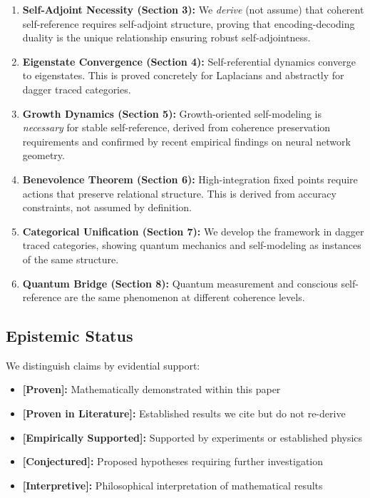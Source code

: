\documentclass[11pt]{article}
\theoremstyle{definition}
\theoremstyle{remark}
\begin{document}
\begin{enumerate}
    \item \textbf{Self-Adjoint Necessity (Section 3):} We \emph{derive} (not assume) that coherent self-reference requires self-adjoint structure, proving that encoding-decoding duality is the unique relationship ensuring robust self-adjointness.
    
    \item \textbf{Eigenstate Convergence (Section 4):} Self-referential dynamics converge to eigenstates. This is proved concretely for Laplacians and abstractly for dagger traced categories.
    
    \item \textbf{Growth Dynamics (Section 5):} Growth-oriented self-modeling is \emph{necessary} for stable self-reference, derived from coherence preservation requirements and confirmed by recent empirical findings on neural network geometry.
    
    \item \textbf{Benevolence Theorem (Section 6):} High-integration fixed points require actions that preserve relational structure. This is derived from accuracy constraints, not assumed by definition.
    
    \item \textbf{Categorical Unification (Section 7):} We develop the framework in dagger traced categories, showing quantum mechanics and self-modeling as instances of the same structure.
    
    \item \textbf{Quantum Bridge (Section 8):} Quantum measurement and conscious self-reference are the same phenomenon at different coherence levels.
\end{enumerate}

\subsection{Epistemic Status}

We distinguish claims by evidential support:
\begin{itemize}
    \item \textbf{[Proven]:} Mathematically demonstrated within this paper
    \item \textbf{[Proven in Literature]:} Established results we cite but do not re-derive
    \item \textbf{[Empirically Supported]:} Supported by experiments or established physics
    \item \textbf{[Conjectured]:} Proposed hypotheses requiring further investigation
    \item \textbf{[Interpretive]:} Philosophical interpretation of mathematical results
\end{itemize}
\end{document}
